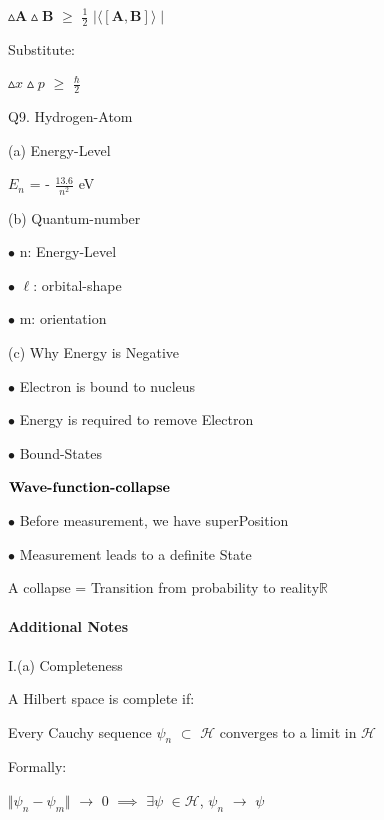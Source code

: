 \documentclass[a4paper, 10pt, onepage]{elegantbook}
\begin{document}
{       $\vartriangle \mathbf A \vartriangle \mathbf B$ $\geq$ $\frac{1}{2}$ $\mid \langle [ \mathbf A, \mathbf B] 
\rangle \mid$ 
  
    Substitute: 
 
       $\vartriangle x \vartriangle p$ $\geq$ $\frac{\hbar}{2}$  

Q9. Hydrogen-Atom 
                                                                                       
    (a) Energy-Level 

    $E_n$ = - $\frac{13.6}{n^2}$ eV 
 
    (b) Quantum-number  
                                                                                                 
    $\bullet$ n: Energy-Level  
  
    $\bullet$ $\ell$: orbital-shape 
 
    $\bullet$ m: orientation 
 
    (c) Why Energy is Negative  
  
    $\bullet$ Electron is bound to nucleus  
  
    $\bullet$ Energy is required to remove Electron   
 
    $\bullet$ Bound-States 

$\mathbf{\textbf{Wave-function-collapse\index{Wave-function-collapse}}}$   
 
$\bullet$ Before measurement, we have superPosition  
  
$\bullet$ Measurement leads to a definite State  

A collapse = Transition from probability to reality$\mathbb R$


\paragraph{Additional Notes}
\noindent

I.(a) Completeness  

A Hilbert space is complete if:  

    Every Cauchy sequence $\psi_n$ $\subset$ $\mathscr H$ converges to a limit in $\mathscr H$  
  
Formally:  
  
    $\Vert \psi_n - \psi_m \Vert$ $\longrightarrow$ 0 $\implies$ $\exists \psi$ $\in \mathscr H$, $\psi_n$ 
$\longrightarrow$ $\psi$ 
   

}
\end{document}
